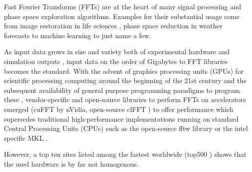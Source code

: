 
Fast Fourier Transforms (FFTs) are at the heart of many signal processing and phase space exploration algorithms. Examples for their substantial usage come from image restoration in life sciences \cite{preibisch2014efficient,schmid2015real}, phase space reduction in weather forecasts \cite{maronga2015parallelized} to machine learning \cite{collobert2011torch7,jia2014caffe,abadi2016tensorflow} to just name a few.

As input data grows in size and variety both of experimental hardware \cite{huisken2004optical} and simulation outputs \cite{maronga2015parallelized}, input data on the order of Gigabytes to FFT libraries becomes the standard. With the advent of graphics processing units (GPUs) for scientific processing computing around the beginning of the 21st century and the subsequent availability of general purpose programming paradigms to program these \cite{du2012cuda}, vendor-specific and open-source libraries to perform FFTs on accelerators emerged (cuFFT \cite{nvidia2010cufft} by nVidia, open-source clFFT \cite{clfft}) to offer performance which supersedes traditional high-performance implementations running on standard Central Processing Units (CPUs) such as the open-source fftw library \cite{FFTW97,FFTW05} or the intel specific MKL \cite{intel2007intel}.

However, a top ten sites listed among the fastest worldwide (top500 \cite{meuer2011top500}) shows that the used hardware is by far not homogenous. 


